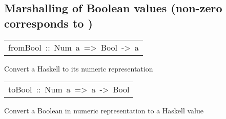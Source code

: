 \subsection{Marshalling of Boolean values (non-zero corresponds to )
}
\begin{haddockdesc}
\item[\begin{tabular}{@{}l}
fromBool\ ::\ Num\ a\ =>\ Bool\ ->\ a
\end{tabular}]\haddockbegindoc
Convert a Haskell  to its numeric representation
\par

\end{haddockdesc}
\begin{haddockdesc}
\item[\begin{tabular}{@{}l}
toBool\ ::\ Num\ a\ =>\ a\ ->\ Bool
\end{tabular}]\haddockbegindoc
Convert a Boolean in numeric representation to a Haskell value
\par

\end{haddockdesc}
